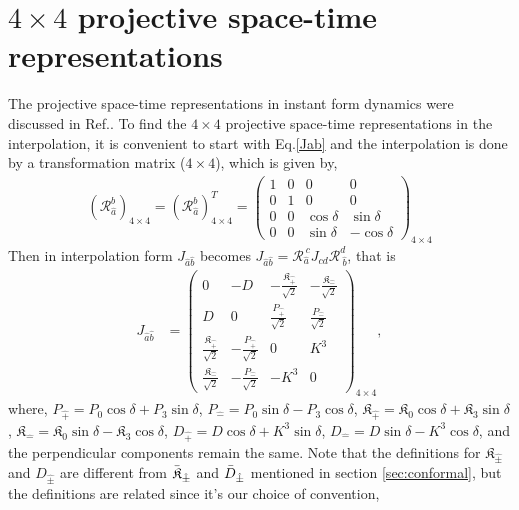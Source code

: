 \documentclass[%
 reprint,
superscriptaddress,
 amsmath,amssymb,
 aps,
]{revtex4-2}
\begin{document}
\section{$4\times4$ projective space-time representations}
\label{sec:projectivespace}
The projective space-time representations in instant form dynamics were discussed in Ref.\cite{Wheeler2009}. To find the $4\times4$ projective space-time representations in the interpolation, it is convenient to start with Eq.\eqref{Jab} and the interpolation is done by a transformation matrix ($4\times4$), which is given by,
\begin{align}
    (\mathcal{R}_{\hat{a}}^{b})_{4\times4}=(\mathcal{R}_{\hat{a}}^{b})^T_{4\times4}=\begin{pmatrix}
    1&0&0&0\\
    0&1&0&0\\
    0&0&\cos{\delta}&\sin{\delta}\\
    0&0&\sin{\delta}&-\cos{\delta}
    \end{pmatrix}_{4\times4}
\end{align}
Then in interpolation form $J_{\hat{a}\hat{b}}$ becomes $J_{\hat{a}\hat{b}}=\mathcal{R}_{\hat{a}}^{~{c}}J_{cd}\mathcal{R}_{~\hat{b}}^{{d}}$, that is
\begin{align}
    J_{\hat{a}\hat{b}}&=\begin{pmatrix}
    0&-D&-\frac{\mathfrak{K}_{\hat{+}}}{\sqrt{2}}&-\frac{\mathfrak{K}_{\hat{-}}}{\sqrt{2}}\\
    D&0&\frac{P_{\hat{+}}}{\sqrt{2}}&\frac{P_{\hat{-}}}{\sqrt{2}}\\
    \frac{\mathfrak{K}_{\hat{+}}}{\sqrt{2}}&-\frac{P_{\hat{+}}}{\sqrt{2}}&0  & {K}^{3}\\
    \frac{\mathfrak{K}_{\hat{-}}}{\sqrt{2}}&-\frac{P_{\hat{-}}}{\sqrt{2}}&-{K}^{3}  & 0
  \end{pmatrix}_{4\times4}\label{Jhat+hat-},
\end{align}
where, $P_{\hat{+}}=P_0\cos{\delta}+P_3\sin{\delta}$, $P_{\hat{-}}=P_0\sin{\delta}-P_3\cos{\delta}$, $
\mathfrak{K}_{\hat{+}}=\mathfrak{K}_0\cos{\delta}+\mathfrak{K}_3\sin{\delta}$, $\mathfrak{K}_{\hat{-}}=\mathfrak{K}_0\sin{\delta}-\mathfrak{K}_3\cos{\delta}$, $D_{\hat{+}}=D\cos\delta+K^{3}\sin\delta$, $D_{\hat{-}}=D\sin\delta-K^{3}\cos\delta$, and the perpendicular components remain the same. Note that the definitions for $\mathfrak{K}_{\hat{\pm}}$ and $D_{\hat{\pm}}$ are different from $\Bar{\mathfrak{K}}_{\hat{\pm}}$ and $\Bar{D}_{\hat{\pm}}$ mentioned in section \ref{sec:conformal}, but the definitions are related since it's our choice of convention,
\end{document}
